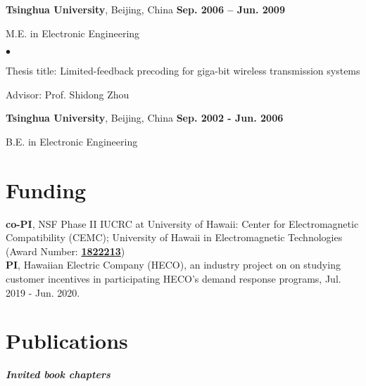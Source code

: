 \documentclass[margin,line]{res}
\newenvironment{list1}{
  \begin{list}{\ding{113}}{%
      \setlength{\itemsep}{0in}
      \setlength{\parsep}{0in} \setlength{\parskip}{0in}
      \setlength{\topsep}{0in} \setlength{\partopsep}{0in}
      \setlength{\leftmargin}{0.17in}}}{\end{list}}
\newenvironment{list2}{
  \begin{list}{$\bullet$}{%
      \setlength{\itemsep}{0in}
      \setlength{\parsep}{0in} \setlength{\parskip}{0in}
      \setlength{\topsep}{0in} \setlength{\partopsep}{0in}
      \setlength{\leftmargin}{0.2in}}}{\end{list}}
\begin{document}
\begin{resume}
{\bf Tsinghua University}, Beijing, China \hfill {\bf
Sep. 2006 -- Jun. 2009}\\
\vspace*{-.1in}
\begin{list1}
\item[] M.E. in Electronic Engineering
\begin{list2}
\vspace*{.05in}
\item Thesis title: Limited-feedback precoding for giga-bit wireless transmission systems
\item Advisor: Prof. Shidong Zhou
\end{list2}
\end{list1}

{\bf Tsinghua University}, Beijing, China \hfill {\bf
Sep. 2002 - Jun. 2006}\\
\vspace*{-.1in}
\begin{list1}
\item[] B.E. in Electronic Engineering
\end{list1}





\section{\sc Funding}
{\bf co-PI}, NSF Phase II IUCRC at University of Hawaii: Center for Electromagnetic Compatibility (CEMC); University of Hawaii in Electromagnetic Technologies (Award Number: \href{https://nsf.gov/awardsearch/showAward?AWD_ID=1822213&HistoricalAwards=false}{\textbf{1822213}}) \\
{\bf PI}, Hawaiian Electric Company (HECO), an industry project on on studying customer incentives in participating HECO's demand response programs, Jul. 2019 - Jun. 2020.




\section{\sc Publications}

%

{\em \textbf{Invited book chapters}}

\vspace{-.3cm}


\end{resume}
\end{document}
